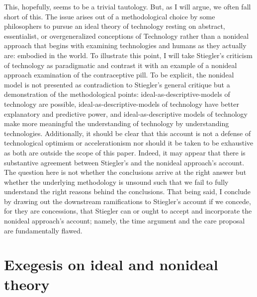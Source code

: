 \documentclass[letterpaper,notitlepage,12pt]{article}
\begin{document}
This, hopefully, seems to be a trivial tautology.
But, as I will argue, we often fall short of this.
The issue arises out of a methodological choice by some philosophers to pursue
an ideal theory of technology resting on abstract, essentialist, or
overgeneralized conceptions of Technology rather than a nonideal approach that
begins with examining technologies and humans as they actually are: embodied in
the world.
To illustrate this point, I will take Stiegler's criticism of technology as
paradigmatic and contrast it with an example of a nonideal approach examination
of the contraceptive pill. To be explicit, the nonideal model is not presented
as contradiction to Stiegler's general critique but a demonstration of the
methodological points: ideal-as-descriptive-models of technology are
possible, ideal-as-descriptive-models of technology have better explanatory
and predictive power, and ideal-as-descriptive models of technology make more
meaningful the understanding of technology by understanding technologies.
Additionally, it should be clear that this account is not a defense of
technological optimism or accelerationism nor should it be taken to be
exhaustive as both are outside the scope of this paper.
Indeed, it may appear that there is substantive agreement between Stiegler's and
the nonideal approach's account.
The question here is not whether the conclusions arrive at the right answer but
whether the underlying methodology is unsound such that we fail to fully
understand the right reasons behind the conclusions.
That being said, I conclude by drawing out the downstream ramifications to
Stiegler's account if we concede, for they are concessions, that Stiegler can or
ought to accept and incorporate the nonideal approach's account; namely, the
time argument and the care proposal are fundamentally flawed.

\section{Exegesis on ideal and nonideal theory}



\end{document}
